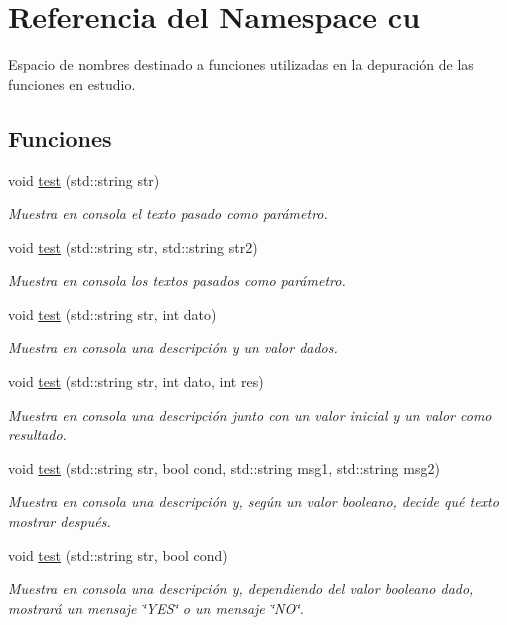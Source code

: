 \hypertarget{namespacecu}{}\section{Referencia del Namespace cu}
\label{namespacecu}


Espacio de nombres destinado a funciones utilizadas en la depuración de las funciones en estudio.  


\subsection*{Funciones}
\begin{DoxyCompactItemize}
\item 
void \hyperlink{namespacecu_a2032e7d323896144cae02cca83ea7776}{test} (std\+::string str)
\begin{DoxyCompactList}\small\item\em Muestra en consola el texto pasado como parámetro. \end{DoxyCompactList}\item 
void \hyperlink{namespacecu_a29c88a60e2e11b522402097bac91dd53}{test} (std\+::string str, std\+::string str2)
\begin{DoxyCompactList}\small\item\em Muestra en consola los textos pasados como parámetro. \end{DoxyCompactList}\item 
void \hyperlink{namespacecu_a204c06884ca90cec812a74a79978ad1b}{test} (std\+::string str, int dato)
\begin{DoxyCompactList}\small\item\em Muestra en consola una descripción y un valor dados. \end{DoxyCompactList}\item 
void \hyperlink{namespacecu_ac74aabcdeff59ad38de0aa36237f8a9b}{test} (std\+::string str, int dato, int res)
\begin{DoxyCompactList}\small\item\em Muestra en consola una descripción junto con un valor inicial y un valor como resultado. \end{DoxyCompactList}\item 
void \hyperlink{namespacecu_a4f3e4a3066ea798b15af01022a14ecf9}{test} (std\+::string str, bool cond, std\+::string msg1, std\+::string msg2)
\begin{DoxyCompactList}\small\item\em Muestra en consola una descripción y, según un valor booleano, decide qué texto mostrar después. \end{DoxyCompactList}\item 
void \hyperlink{namespacecu_af2ea0a4da4f2192d226ca8c3bddbd821}{test} (std\+::string str, bool cond)
\begin{DoxyCompactList}\small\item\em Muestra en consola una descripción y, dependiendo del valor booleano dado, mostrará un mensaje \char`\"{}\+Y\+E\+S\char`\"{} o un mensaje \char`\"{}\+N\+O\char`\"{}. \end{DoxyCompactList}\end{DoxyCompactItemize}

